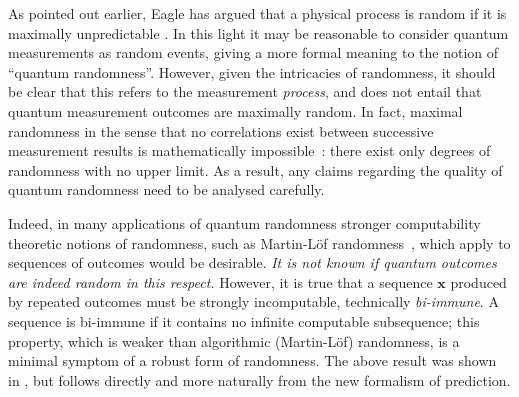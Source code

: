 \documentclass[%
 superscriptaddress,
 preprint,
 showpacs,
 showkeys,
 preprintnumbers,
  amsmath,amssymb,
  aps,
 pra,
  longbibliography,
  floatfix,
 ]{revtex4-1}
\theoremstyle{definition}
\newcommand{\x}{\mathbf{x}}
\begin{document}
{\color{green}As pointed out earlier,} Eagle has argued that a physical process is random if it is maximally unpredictable \cite{Eagle:2005ys}.
In this light it may be reasonable to consider quantum measurements as random events, giving a more formal meaning to the notion of ``quantum randomness''.
However, given the intricacies of randomness, it should be clear that this refers to the measurement \emph{process}, and does not entail that quantum measurement outcomes are maximally random.
In fact, maximal randomness in the sense that no correlations exist between successive measurement results is %
mathematically impossible~\cite{GS-90,calude:02}: there exist only degrees of randomness with no upper limit.
As a result, any claims regarding the quality of quantum randomness need to be analysed carefully.%


Indeed, in many applications of quantum randomness stronger computability theoretic notions of randomness, such as Martin-L\"of randomness~\cite{calude:02}, which apply to sequences of outcomes would be desirable.
{\em It is not known if quantum outcomes are indeed random in this respect.}
However, it is true that a sequence $\x$ produced by repeated outcomes must be strongly incomputable, technically {\em bi-immune}. A  sequence is bi-immune if it contains no infinite computable subsequence; this property, which is weaker than algorithmic (Martin-L\"of) randomness, is a minimal symptom of a robust form of randomness.
The above result was shown in \cite{svozil-2006-ran,2012-incomput-proofsCJ}, but follows directly and more naturally from the new formalism of prediction.
\end{document}
